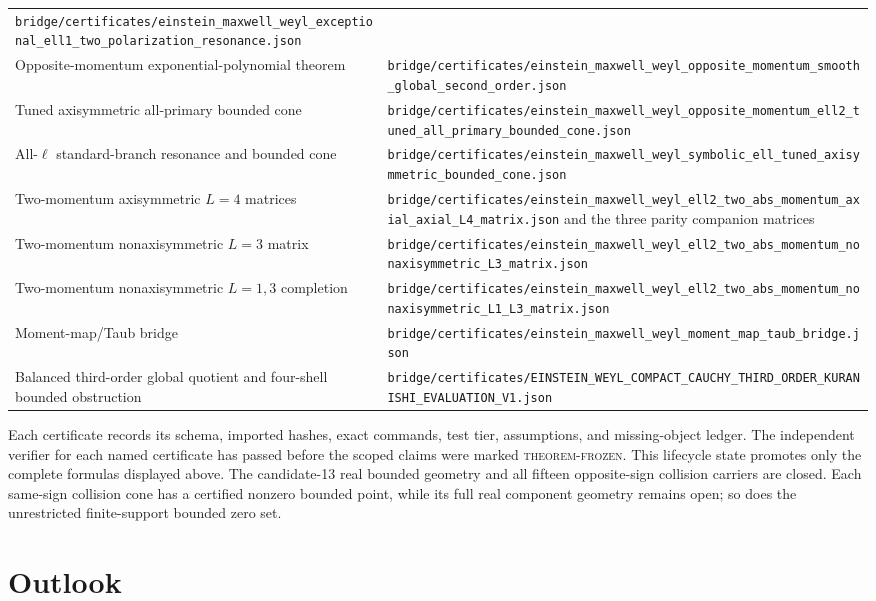 \documentclass[11pt]{article}
\theoremstyle{definition}
\theoremstyle{remark}
\newcommand{\cert}[1]{\nolinkurl{#1}}
\begin{document}
\begin{longtable}{@{}>{\raggedright\arraybackslash}p{} >{\raggedright\arraybackslash}p{}@{}}
\cert{bridge/certificates/einstein_maxwell_weyl_exceptional_ell1_two_polarization_resonance.json}\\
Opposite-momentum exponential-polynomial theorem &
\cert{bridge/certificates/einstein_maxwell_weyl_opposite_momentum_smooth_global_second_order.json}\\
Tuned axisymmetric all-primary bounded cone &
\cert{bridge/certificates/einstein_maxwell_weyl_opposite_momentum_ell2_tuned_all_primary_bounded_cone.json}\\
All-\(\ell\) standard-branch resonance and bounded cone &
\cert{bridge/certificates/einstein_maxwell_weyl_symbolic_ell_tuned_axisymmetric_bounded_cone.json}\\
Two-momentum axisymmetric \(L=4\) matrices &
\cert{bridge/certificates/einstein_maxwell_weyl_ell2_two_abs_momentum_axial_axial_L4_matrix.json} and the three parity companion matrices\\
Two-momentum nonaxisymmetric \(L=3\) matrix &
\cert{bridge/certificates/einstein_maxwell_weyl_ell2_two_abs_momentum_nonaxisymmetric_L3_matrix.json}\\
Two-momentum nonaxisymmetric \(L=1,3\) completion &
\cert{bridge/certificates/einstein_maxwell_weyl_ell2_two_abs_momentum_nonaxisymmetric_L1_L3_matrix.json}\\
Moment-map/Taub bridge &
\cert{bridge/certificates/einstein_maxwell_weyl_moment_map_taub_bridge.json}\\
Balanced third-order global quotient and four-shell bounded obstruction &
\cert{bridge/certificates/EINSTEIN_WEYL_COMPACT_CAUCHY_THIRD_ORDER_KURANISHI_EVALUATION_V1.json}\\
\end{longtable}
\endgroup

Each certificate records its schema, imported hashes, exact commands, test
tier, assumptions, and missing-object ledger.  The independent verifier for
each named certificate has passed before the scoped claims were marked
\textsc{theorem-frozen}.  This lifecycle state promotes only the complete
formulas displayed above.  The candidate-13 real bounded geometry and all
fifteen opposite-sign collision carriers are closed.  Each same-sign
collision cone has a certified nonzero bounded point, while its full real
component geometry remains open; so does the unrestricted finite-support
bounded zero set.

\section{Outlook}
\end{document}
